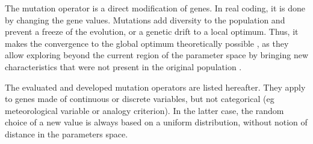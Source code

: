 \documentclass{ametsoc}
\begin{document}
The mutation operator is a direct modification of genes. In real coding, it is done by changing the gene values. Mutations add diversity to the population and prevent a freeze of the evolution, or a genetic drift to a local optimum. Thus, it makes the convergence to the global optimum theoretically possible \citep{Beasley1993a}, as they allow exploring beyond the current region of the parameter space by bringing new characteristics that were not present in the original population \citep{Haupt2004}. 

The evaluated and developed mutation operators are listed hereafter. They apply to genes made of continuous or discrete variables, but not categorical (eg meteorological variable or analogy criterion). In the latter case, the random choice of a new value is always based on a uniform distribution, without notion of distance in the parameters space.
\end{document}
